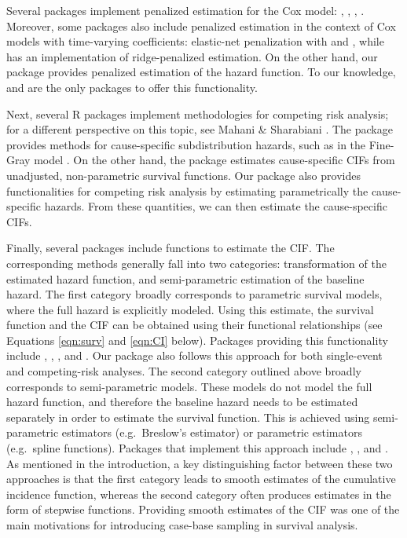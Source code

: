Several packages implement penalized estimation for the Cox model:
 \citeyearpar{regpathcox}, 
\citeyearpar{park_hastie},  \citeyearpar{l1penal},
 \citeyearpar{gerds_blanche}. Moreover, some
packages also include penalized estimation in the context of Cox models
with time-varying coefficients: elastic-net penalization with
 \citeyearpar{perperoglou} and 
\citeyearpar{clements_liu}, while 
\citeyearpar{survival-package} has an implementation of ridge-penalized
estimation. On the other hand, our package  provides
penalized estimation of the hazard function. To our knowledge,
 and  are the only packages to offer this
functionality.

Next, several \textsf{R} packages implement methodologies for competing
risk analysis; for a different perspective on this topic, see Mahani \&
Sharabiani \citeyearpar{mahani2015bayesian}. The package 
provides methods for cause-specific subdistribution hazards, such as in
the Fine-Gray model \citeyearpar{fine1999proportional}. On the other
hand, the package  estimates cause-specific CIFs from
unadjusted, non-parametric survival functions. Our package
 also provides functionalities for competing risk analysis
by estimating parametrically the cause-specific hazards. From these
quantities, we can then estimate the cause-specific CIFs.

Finally, several packages include functions to estimate the CIF. The
corresponding methods generally fall into two categories: transformation
of the estimated hazard function, and semi-parametric estimation of the
baseline hazard. The first category broadly corresponds to parametric
survival models, where the full hazard is explicitly modeled. Using this
estimate, the survival function and the CIF can be obtained using their
functional relationships (see Equations \ref{eqn:surv} and \ref{eqn:CI}
below). Packages providing this functionality include ,
, , and . Our package
 also follows this approach for both single-event and
competing-risk analyses. The second category outlined above broadly
corresponds to semi-parametric models. These models do not model the
full hazard function, and therefore the baseline hazard needs to be
estimated separately in order to estimate the survival function. This is
achieved using semi-parametric estimators (e.g.~Breslow's estimator) or
parametric estimators (e.g.~spline functions). Packages that implement
this approach include , , and
. As mentioned in the introduction, a key distinguishing
factor between these two approaches is that the first category leads to
smooth estimates of the cumulative incidence function, whereas the
second category often produces estimates in the form of stepwise
functions. Providing smooth estimates of the CIF was one of the main
motivations for introducing case-base sampling in survival analysis.


